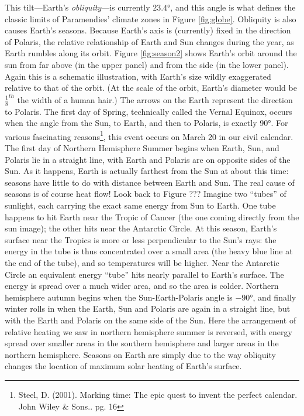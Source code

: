 This tilt---Earth's \emph{obliquity}---is currently $\ang{23.4}$, and this angle is what defines the classic limits of Paramendies' climate zones in Figure \ref{fig:globe}. Obliquity is also causes Earth's seasons. Because Earth's axis is (currently) fixed in the direction of Polaris, the relative relationship of Earth and Sun changes during the year, as Earth rumbles along its orbit. Figure \ref{fig:season2} shows Earth's orbit around the sun from far above (in the upper panel) and from the side (in the lower panel). Again this is a schematic illustration, with Earth's size wildly exaggerated relative to that of the orbit. (At the scale of the orbit, Earth's diameter would be $\frac{1}{8}^{th}$ the width of a human hair.) The arrows on the Earth represent the direction to Polaris. The first day of Spring, technically called the Vernal Equinox, occurs when the angle from the Sun, to Earth, and then to Polaris, is exactly \ang{90}. For various fascinating reasons\footnote{Steel, D. (2001). Marking time: The epic quest to invent the perfect calendar. John Wiley \& Sons.. pg. 16}, this event occurs on March 20 in our civil calendar.\\
The first day of Northern Hemisphere Summer begins when Earth, Sun, and Polaris lie in a straight line, with Earth and Polaris are on opposite sides of the Sun. As it happens, Earth is actually farthest from the Sun at about this time: seasons have little to do with distance \label{distance_cite} between Earth and Sun. The real cause of seasons is of course heat flow! Look back to Figure ??? Imagine two ``tubes'' of sunlight, each carrying the exact same energy from Sun to Earth. One tube happens to hit Earth near the Tropic of Cancer (the one coming directly from the sun image); the other hits near the Antarctic Circle. At this season, Earth's surface near the Tropics is more or less perpendicular to the Sun's rays: the energy in the tube is thus concentrated over a small area (the heavy blue line at the end of the tube), and so temperatures will be higher. Near the Antarctic Circle an equivalent energy ``tube'' hits nearly parallel to Earth's surface. The energy is spread over a much wider area, and so the area is colder. Northern hemisphere autumn begins when the Sun-Earth-Polaris angle is $\ang{-90}$, and finally winter rolls in when the Earth, Sun and Polaris are again in a straight line, but with the Earth and Polaris on the same side of the Sun. Here the arrangement of relative heating we saw in northern hemisphere summer is reversed, with energy spread over smaller areas in the southern hemisphere and larger areas in the northern hemisphere. Seasons on Earth are simply due to the way obliquity changes the location of maximum solar heating of Earth's surface.\\
